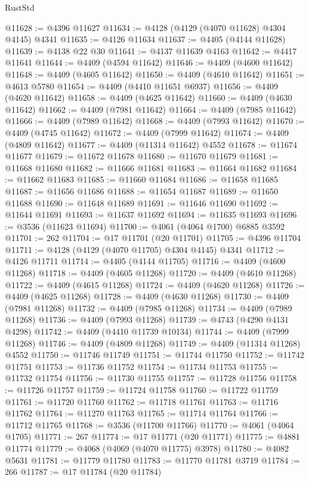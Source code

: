 \begin{lexlean}{RustStd}
\begin{coremodule}
@11628 := @4396 @11627
@11634 := @4128 (@4129 (@4070 @11628) @4304 @4145) @4341
@11635 := @4126 @11634
@11637 := @4405 (@4144 @11628)
@11639 := @4138 @22 @30
@11641 := @4137 @11639 @4163
@11642 := @4417 @11641
@11644 := @4409 (@4594 @11642)
@11646 := @4409 (@4600 @11642)
@11648 := @4409 (@4605 @11642)
@11650 := @4409 (@4610 @11642)
@11651 := @4613 @5780
@11654 := @4409 (@4410 @11651 @6937)
@11656 := @4409 (@4620 @11642)
@11658 := @4409 (@4625 @11642)
@11660 := @4409 (@4630 @11642)
@11662 := @4409 (@7981 @11642)
@11664 := @4409 (@7985 @11642)
@11666 := @4409 (@7989 @11642)
@11668 := @4409 (@7993 @11642)
@11670 := @4409 (@4745 @11642)
@11672 := @4409 (@7999 @11642)
@11674 := @4409 (@4809 @11642)
@11677 := @4409 (@11314 @11642) @4552
@11678 := @11674 @11677
@11679 := @11672 @11678
@11680 := @11670 @11679
@11681 := @11668 @11680
@11682 := @11666 @11681
@11683 := @11664 @11682
@11684 := @11662 @11683
@11685 := @11660 @11684
@11686 := @11658 @11685
@11687 := @11656 @11686
@11688 := @11654 @11687
@11689 := @11650 @11688
@11690 := @11648 @11689
@11691 := @11646 @11690
@11692 := @11644 @11691
@11693 := @11637 @11692
@11694 := @11635 @11693
@11696 := @3536 (@11623 @11694)
@11700 := @4061 (@4064 @1700) @6885 @3592
@11701 := 262
@11704 := @17 @11701 (@20 @11701)
@11705 := @4396 @11704
@11711 := @4128 (@4129 (@4070 @11705) @4304 @4145) @4341
@11712 := @4126 @11711
@11714 := @4405 (@4144 @11705)
@11716 := @4409 (@4600 @11268)
@11718 := @4409 (@4605 @11268)
@11720 := @4409 (@4610 @11268)
@11722 := @4409 (@4615 @11268)
@11724 := @4409 (@4620 @11268)
@11726 := @4409 (@4625 @11268)
@11728 := @4409 (@4630 @11268)
@11730 := @4409 (@7981 @11268)
@11732 := @4409 (@7985 @11268)
@11734 := @4409 (@7989 @11268)
@11736 := @4409 (@7993 @11268)
@11739 := @4743 (@4290 @4131 @4298)
@11742 := @4409 (@4410 @11739 @10134)
@11744 := @4409 (@7999 @11268)
@11746 := @4409 (@4809 @11268)
@11749 := @4409 (@11314 @11268) @4552
@11750 := @11746 @11749
@11751 := @11744 @11750
@11752 := @11742 @11751
@11753 := @11736 @11752
@11754 := @11734 @11753
@11755 := @11732 @11754
@11756 := @11730 @11755
@11757 := @11728 @11756
@11758 := @11726 @11757
@11759 := @11724 @11758
@11760 := @11722 @11759
@11761 := @11720 @11760
@11762 := @11718 @11761
@11763 := @11716 @11762
@11764 := @11270 @11763
@11765 := @11714 @11764
@11766 := @11712 @11765
@11768 := @3536 (@11700 @11766)
@11770 := @4061 (@4064 @1705)
@11771 := 267
@11774 := @17 @11771 (@20 @11771)
@11775 := @4881 @11774
@11779 := @4068 (@4069 (@4070 @11775) @3978)
@11780 := @4082 @5631
@11781 := @11779 @11780
@11783 := @11770 @11781 @3719
@11784 := 266
@11787 := @17 @11784 (@20 @11784)

\end{coremodule}
\end{lexlean}
